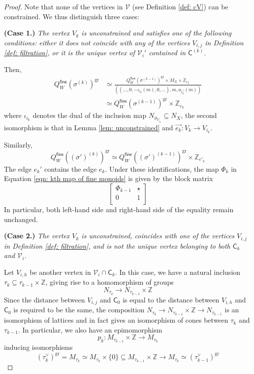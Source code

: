 \documentclass{article}
\def\cV{\mathcal{V}}
\def\Z{\mathbb{Z}}
\newcommand{\tropC}{\mathsf{C}}
\newcommand{\gr}{\mathrm{gr}}
\newcommand{\fine}{\mathsf{fine}}
\begin{document}
\begin{proof}
    Note that none of the vertices in $\cV$ (see Definition \ref{def: cV}) can be constrained. We thus distinguish three cases:

    \medskip
    \noindent \textbf{(Case 1.)} \emph{The vertex $V_k$ is unconstrained and satisfies one of the following conditions: either it does not coincide with any of the vertices $V_{i,j}$ in Definition \ref{def: filtration}, or it is the unique vertex of $\mathcal{V}_i'$ contained in $\tropC^{(k)}$.}

    Then,
    \begin{align*}
        Q^{\fine}_W(\sigma^{(k)})^{\gr} 
        &\simeq \frac{Q^{\fine}_W(\sigma^{(k-1)})^{\gr} \times M_X \times \mathbb{Z}_{e_k}}{((\ldots, 0,-\iota_{i_k}(m),0,\dots ), m, u_{\vec{e_k}}(m))} \\
        &\simeq Q^{\fine}_W(\sigma^{(k-1)})^{\gr} \times \mathbb{Z}_{e_k}
    \end{align*}
    where $\iota_{i_k}$ denotes the dual of the inclusion map $N_{\vartheta_{V_{i_k}}} \subseteq N_X$, the second isomorphism is that in Lemma \ref{lem: unconstrained} and $\vec{e_k}: V_k \to V_{i_k}$.

    Similarly, 
    $$  
        Q^{\fine}_W((\sigma')^{(k)})^{\gr} \simeq Q^{\fine}_W((\sigma')^{(k-1)})^{\gr} \times \mathbb{Z}_{e'_k}
    $$
    The edge $e_k'$ contains the edge $e_k$. Under these identifications, the map $\Phi_k$ in Equation \eqref{eqn: kth map of fine monoids} is given by the block matrix 
    $$\begin{bmatrix}
        \Phi_{k-1} & \star \\
        0 & 1\\
    \end{bmatrix}$$
    In particular, both left-hand side and right-hand side of the equality remain unchanged.

    \medskip
    \noindent \textbf{(Case 2.)} \emph{The vertex $V_k$ is unconstrained, coincides with one of the vertices $V_{i,j}$ in Definition \ref{def: filtration}, and is not the unique vertex belonging to both $\tropC_k$ and $\cV_i$.}

    Let $V_{i,h}$ be another vertex in $\cV_i \cap \tropC_k$. In this case, we have a natural inclusion $\tau_k \subseteq \tau_{k-1} \times \Z$, giving rise to a homomorphism of groups
    $$
    N_{\tau_k} \to N_{\tau_{k-1}} \times \Z
    $$
    Since the distance between $V_{i,j}$ and $\mathsf{C}_0$ is equal to the distance between $V_{i,h}$ and $\tropC_0$ is required to be the same, the composition $ N_{\tau_k} \to N_{\tau_{k-1}} \times \Z \to N_{\tau_{k-1}}$ is an isomorphism of lattices and in fact gives an isomorphism of cones between $\tau_k$ and $\tau_{k-1}$. In particular, we also have an epimomorphism
    $$
    p_k: M_{\tau_{k-1}} \times \Z \to M_{\tau_k}
    $$
    inducing isomorphisms
    $$
    (\tau_{k}^\vee)^{\gr} = M_{\tau_k} \simeq M_{\tau_k} \times \{0\}  \subseteq  M_{\tau_{k-1}} \times \Z \to M_{\tau_k} \simeq (\tau_{k-1}^\vee)^{\gr}
    $$


\end{proof}
\end{document}
